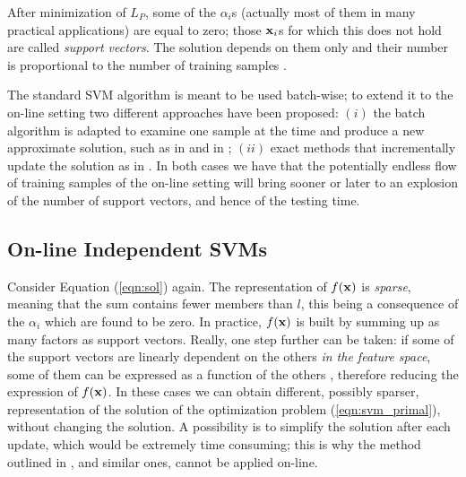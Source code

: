 After minimization of $L_P$, some of the $\alpha_i$s (actually most of them
in many practical applications) are equal to zero; those $\mathbf{x}_i$s for which
this does not hold are called \emph{support vectors}. The solution depends on
them only and their number is proportional to the number of
training samples \cite{Steinwart03}.

The standard SVM algorithm is meant to be used batch-wise; to extend it
to the on-line setting two different approaches have been proposed:
$(i)$ the batch algorithm is adapted to examine one sample at the time
and produce a new approximate solution, such as in \cite{SyedLS99} and in 
\cite{KivinenSW04,ChengVSWC07};
$(ii)$ exact methods that incrementally update the solution as in \cite{CauwenberghsP00}.
In both cases we have that the potentially endless flow of training samples
of the on-line setting will bring sooner or later to an explosion of the number of
support vectors, and hence of the testing time.


\subsection{On-line Independent SVMs}

Consider Equation (\ref{eqn:sol}) again. The representation of $f(\mathbf{x})$ is
\emph{sparse}, meaning that the sum contains fewer members than $l$, this
being a consequence of the $\alpha_i$ which are found to be zero. In practice,
$f(\mathbf{x})$ is built by summing up as many factors as support vectors. Really, one
step further can be taken: if some of the support vectors are linearly dependent
on the others \emph{in the feature space}, some of them can be expressed as a
function of the others \cite{DownsGM01}, therefore reducing the expression
of $f(\mathbf{x})$. In these cases we can obtain different, possibly sparser,
representation of the solution of the optimization problem (\ref{eqn:svm_primal}), without
changing the solution. A possibility is to simplify the solution after each
update, which  would be extremely time consuming; this is why the method outlined in
\cite{DownsGM01}, and similar ones, cannot be applied on-line.

